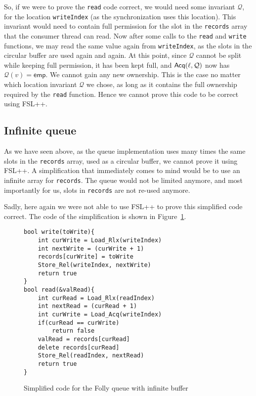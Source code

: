 So, if we were to prove the \texttt{read} code correct, we would need some invariant $\mathcal{Q}$, for the location \texttt{writeIndex} (as the synchronization uses this location). This invariant would need to contain full permission for the slot in the \texttt{records} array that the consumer thread can read. Now after some calls to the \texttt{read} and \texttt{write} functions, we may read the same value again from \texttt{writeIndex}, as the slots in the circular buffer are used again and again. At this point, since $\mathcal{Q}$ cannot be split while keeping full permission, it has been kept full, and $\operatorname{\mathsf{Acq}}(\ell, \mathcal{Q})$ now has $\mathcal{Q}(v) = \mathsf{emp}$. We cannot gain any new ownership. This is the case no matter which location invariant $\mathcal{Q}$ we chose, as long as it contains the full ownership required by the \texttt{read} function. Hence we cannot prove this code to be correct using FSL++.

\subsection{Infinite queue}
As we have seen above, as the queue implementation uses many times the same slots in the \texttt{records} array, used as a circular buffer, we cannot prove it using FSL++. A simplification that immediately comes to mind would be to use an infinite array for \texttt{records}. The queue would not be limited anymore, and most importantly for us, slots in \texttt{records} are not re-used anymore.

Sadly, here again we were not able to use FSL++ to prove this simplified code correct. The code of the simplification is shown in Figure~\ref{fig:queueCode}. 

\begin{figure}
\begin{lstlisting}
bool write(toWrite){
	int curWrite = Load_Rlx(writeIndex)
	int nextWrite = (curWrite + 1)
	records[curWrite] = toWrite
	Store_Rel(writeIndex, nextWrite)
	return true
}
bool read(&valRead){
	int curRead = Load_Rlx(readIndex)
	int nextRead = (curRead + 1)
	int curWrite = Load_Acq(writeIndex)
	if(curRead == curWrite)
		return false
	valRead = records[curRead]
	delete records[curRead]
	Store_Rel(readIndex, nextRead)
	return true
}

\end{lstlisting}
		\caption{Simplified code for the Folly queue with infinite buffer}
		\label{fig:queueCode}
\end{figure}



